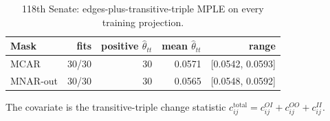 \begin{table}[tbp]
\centering
\small
\caption{118th Senate: edges-plus-transitive-triple MPLE on every training projection.}
\label{tab:mtt-check}
\begin{tabular}{lrrrr}
\toprule
Mask & fits & positive $\hat\theta_{tt}$ & mean $\hat\theta_{tt}$ & range \\
\midrule
MCAR & 30/30 & 30 & 0.0571 & [0.0542, 0.0593] \\
MNAR-out & 30/30 & 30 & 0.0565 & [0.0548, 0.0592] \\
\bottomrule
\end{tabular}
\par\vspace{2pt}\footnotesize The covariate is the transitive-triple change statistic $c^{\mathrm{total}}_{ij}=c^{OI}_{ij}+c^{OO}_{ij}+c^{II}_{ij}$.
\end{table}